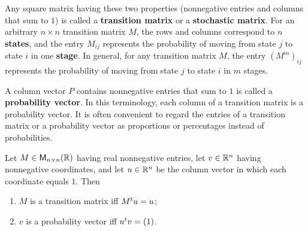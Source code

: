 \begin{defn}\label{5.3.4}
  Any square matrix having these two properties (nonnegative entries and columns that sum to \(1\)) is called a \textbf{transition matrix} or a \textbf{stochastic matrix}.
  For an arbitrary \(n \times n\) transition matrix \(M\), the rows and columns correspond to \(n\) \textbf{states}, and the entry \(M_{i j}\) represents the probability of moving from state \(j\) to state \(i\) in one \textbf{stage}.
  In general, for any transition matrix \(M\), the entry \((M^m)_{i j}\) represents the probability of moving from state \(j\) to state \(i\) in \(m\) stages.

  A column vector \(P\) contains nonnegative entries that sum to \(1\) is called a \textbf{probability vector}.
  In this terminology, each column of a transition matrix is a probability vector.
  It is often convenient to regard the entries of a transition matrix or a probability vector as proportions or percentages instead of probabilities.
\end{defn}

\begin{thm}\label{5.15}
  Let \(M \in \ms[n][n][\R]\) having real nonnegative entries, let \(v \in \mathbb{R}^n\) having nonnegative coordinates, and let \(u \in \mathbb{R}^n\) be the column vector in which each coordinate equals \(1\).
  Then
  \begin{enumerate}
    \item \(M\) is a transition matrix iff \({M}^{t} u = u\);
    \item \(v\) is a probability vector iff \({u}^{t} v = (1)\).
  \end{enumerate}
\end{thm}

